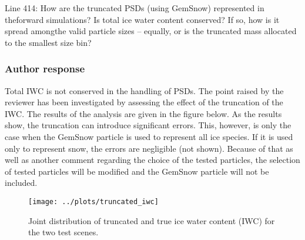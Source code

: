 \documentclass[11pt]{scrartcl}
\begin{document}
Line  414:  How  are  the  truncated  PSDs  (using  GemSnow)  represented  in  theforward simulations? Is total ice water content conserved? If so, how is it spread amongthe valid particle sizes – equally, or is the truncated mass allocated to the smallest size bin?

\subsubsection*{Author response}
Total IWC is not conserved in the handling of PSDs. The point raised by the reviewer has been
investigated by assessing the effect of the truncation of the IWC. The results of the analysis
are given in the figure below. As the results show, the truncation can introduce significant
errors. This, however, is only the case when the GemSnow particle is used to represent all
ice species. If it is used only to represent snow, the errors are negligible (not shown). Because
of that as well as another comment regarding the choice of the tested particles, the selection of
tested particles will be modified and the GemSnow particle will not be included.

\begin{figure}[!hbpt]
  \centering
  \texttt{[image: ../plots/truncated\_iwc]}
  \caption{Joint distribution of truncated and true ice water content (IWC) for the
    two test scenes.}
\end{figure}
\end{document}

